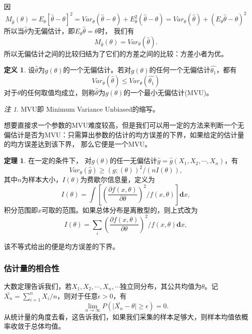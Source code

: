 \documentclass[a4paper,11pt]{article}%
\theoremstyle{remark}
\newtheorem*{remark}{注}
\theoremstyle{remark}
\theoremstyle{definition}
\newtheorem{theorem}{定理}[section]
\theoremstyle{definition}
\newtheorem*{definition}{定义}
\theoremstyle{plain}
\newcommand*{\abs}[1]{\lvert #1 \rvert}
\begin{document}
因
\[M_{\hat{\theta}}(\theta)=E_{\theta}[\hat{\theta}-\theta]^2=Var_{\theta}(\hat{\theta}-\theta)+E_{\theta}^2(\hat{\theta}-\theta)=Var_{\theta}(\hat{\theta})+(E_{\theta}\hat{\theta}-\theta)^2\]
所以当$\hat{\theta}$为无偏估计，即$E_{\theta}\hat{\theta}=\theta$时， 我们有 
\[M_{\hat{\theta}}(\theta)=Var_{\theta}(\hat{\theta}).\]
所以无偏估计之间的比较归结为了它们的方差之间的比较：方差小者为优。
\begin{definition}
    设$\hat{\theta}$为$g(\theta)$的一个无偏估计。若对$g(\theta)$的任何一个无偏估计$\hat{\theta_1}$，都有
    \[Var_{\theta}(\hat{\theta})\leq Var_{\theta}(\hat{\theta_1})\]
    对于$\theta$的任何取值均成立，则称$\hat{\theta}$为$g(\theta)$的一个最小无偏估计(MVU)。
\end{definition}
\begin{remark}
    MVU即 Minimum Variance Unbiased的缩写。
\end{remark}
想要直接求一个参数的MVU难度较高，但是我们可以用一定的方法来判断一个无偏估计是否为MVU：只需算出参数的估计的均方误差的下界，如果给定的估计量的均方误差达到该下界，
那么它便是一个MVU。
\begin{theorem}
    在一定的条件下， 对$g(\theta)$的任一无偏估计$\hat{g}=\hat{g}(X_1,X_2,\cdots,X_n)$，有 
    \[ Var_{\theta}(\hat{g})\geq (g;(\theta))^2/(nI(\theta)),\]
    其中$n$为样本大小，$I(\theta)$为费歇尔信息量，定义为
    \[I(\theta)=\int\left[\left(\frac{\partial f(x,\theta)}{\partial\theta}\right)^2/f(x,\theta)\right]\mathbf{d}x,\]
    积分范围即$x$可取的范围。如果总体分布是离散型的，则上式改为 
    \[I(\theta)=\sum_i\left(\frac{\partial f(x,\theta)}{\partial\theta}\right)^2/f(x,\theta)\mathbf{d}x,\]
\end{theorem}
该不等式给出的便是均方误差的下界。
\subsubsection{估计量的相合性}
大数定理告诉我们，若$X_1,X_2,\cdots,X_n,\cdots$独立同分布，其公共均值为$\theta$。记$\bar{X_n}=\sum_{i=1}^nX_i/n$，则对于任意$\epsilon>0$，有
\[\lim_{n\rightarrow\infty}P(\abs{\bar{X_n}-\theta}\geq \epsilon)=0.\]
从统计量的角度去看，这告诉我们，如果我们采集的样本足够大，则样本均值依概率收敛于总体均值。
\end{document}
